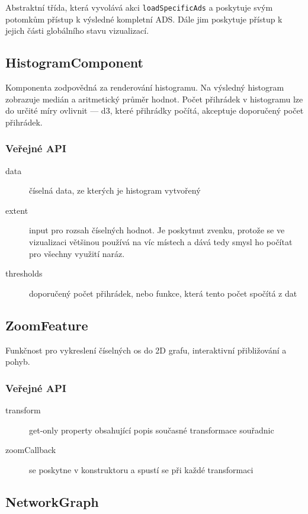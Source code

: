 Abstraktní třída, která vyvolává akci \lstinline|loadSpecificAds| a poskytuje svým potomkům přístup k výsledné kompletní ADS. Dále jim poskytuje přístup k jejich části globálního stavu vizualizací.

\subsection{HistogramComponent}

Komponenta zodpovědná za renderování histogramu. Na výsledný histogram zobrazuje medián a aritmetický průměr hodnot. Počet přihrádek v histogramu lze do určité míry ovlivnit --- d3, které přihrádky počítá, akceptuje doporučený počet přihrádek.

\subsubsection*{Veřejné API}

\begin{description}
  \item[data] číselná data, ze kterých je histogram vytvořený
  \item[extent] input pro rozsah číselných hodnot. Je poskytnut zvenku, protože se ve vizualizaci většinou používá na víc místech a dává tedy smysl ho počítat pro všechny využití naráz.
  \item[thresholds] doporučený počet přihrádek, nebo funkce, která tento počet spočítá z dat
\end{description}

\subsection{ZoomFeature}
Funkčnost pro vykreslení číselných os do 2D grafu, interaktivní přibližování a pohyb.

\subsubsection*{Veřejné API}

\begin{description}
  \item[transform] get-only property obsahující popis současné transformace souřadnic
  \item[zoomCallback] se poskytne v konstruktoru a spustí se při každé transformaci
\end{description}

\subsection{NetworkGraph}

